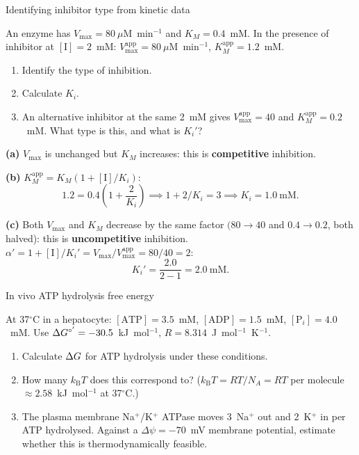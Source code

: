 \documentclass[12pt, a4paper, oneside]{report}
\begin{document}
\begin{problem}{\enspace{}\enspace
  Identifying inhibitor type from kinetic data}

  An enzyme has $V_{\max} = 80~\mu$M~min$^{-1}$ and
  $K_M = 0.4$~mM. In the presence of inhibitor at $[\mathrm{I}] = 2$~mM:
  $V_{\max}^\text{app} = 80~\mu$M~min$^{-1}$, $K_M^\text{app} = 1.2$~mM.

  \begin{enumerate}
    \item Identify the type of inhibition.
    \item Calculate $K_i$.
    \item An alternative inhibitor at the same 2~mM gives
          $V_{\max}^\text{app} = 40$ and $K_M^\text{app} = 0.2$~mM.
          What type is this, and what is $K_i'$?
  \end{enumerate}
\end{problem}

\begin{solution}
  \textbf{(a)} $V_{\max}$ is unchanged but $K_M$ increases: this is
  \textbf{competitive} inhibition.

  \textbf{(b)} $K_M^\text{app} = K_M(1 + [\mathrm{I}]/K_i)$:
  \[
    1.2 = 0.4\left(1 + \frac{2}{K_i}\right)
    \implies 1 + 2/K_i = 3 \implies K_i = 1.0~\text{mM}.
  \]

  \textbf{(c)} Both $V_{\max}$ and $K_M$ decrease by the same factor
  $(80 \to 40$ and $0.4 \to 0.2$, both halved): this is
  \textbf{uncompetitive} inhibition.\\
  $\alpha' = 1 + [\mathrm{I}]/K_i' = V_{\max}/V_{\max}^\text{app} = 80/40 = 2$:
  \[
    K_i' = \frac{2.0}{2 - 1} = 2.0~\text{mM}.
  \]
\end{solution}

\begin{problem}{\enspace{}\enspace
  In vivo ATP hydrolysis free energy}

  At 37$^\circ$C in a hepatocyte: $[\mathrm{ATP}] = 3.5$~mM,
  $[\mathrm{ADP}] = 1.5$~mM, $[\mathrm{P}_i] = 4.0$~mM.
  Use $\Delta G^{\circ'} = -30.5$~kJ~mol$^{-1}$,
  $R = 8.314$~J~mol$^{-1}$~K$^{-1}$.

  \begin{enumerate}
    \item Calculate $\Delta G$ for ATP hydrolysis under these conditions.
    \item How many $k_\mathrm{B}T$ does this correspond to? ($k_\mathrm{B}T
          = RT/N_A = RT$ per molecule $\approx 2.58$~kJ~mol$^{-1}$ at 37$^\circ$C.)
    \item The plasma membrane Na$^+$/K$^+$ ATPase moves 3~Na$^+$
          out and 2~K$^+$ in per ATP hydrolysed. Against a
          $\Delta\psi = -70$~mV membrane potential, estimate whether
          this is thermodynamically feasible.
  \end{enumerate}
\end{problem}
\end{document}
